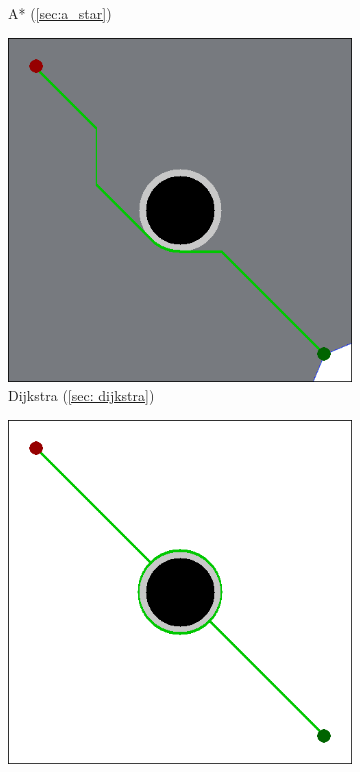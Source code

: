 \begin{figure}[h]
\begin{subfigure}[b]{0.2\linewidth}
    \caption{A* (\ref{sec:a_star}) \newline}
  \end{subfigure}
  \hfill
  \begin{subfigure}[b]{0.2\linewidth}
    \includegraphics[width=\linewidth]{images/screenshot_46.png}
     \caption{Dijkstra (\ref{sec: dijkstra}) \newline}
  \end{subfigure}
  \hfill
  \begin{subfigure}[b]{0.2\linewidth}
    \includegraphics[width=\linewidth]{images/screenshot_47.png}

\end{subfigure}
\end{figure}
